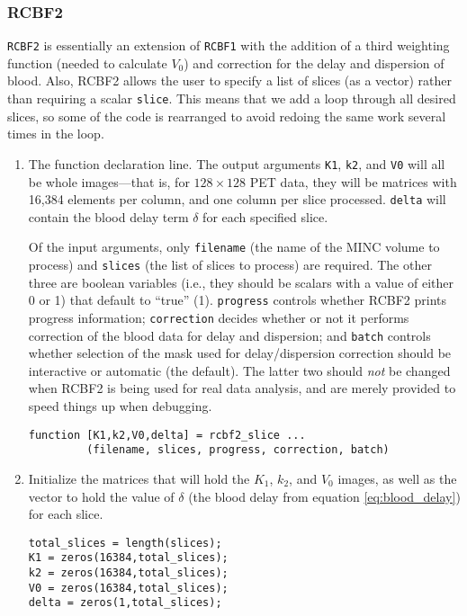 \documentclass[12pt]{article}
\def\code#1{{\tt #1}}
\begin{document}
\subsubsection{RCBF2}
\label{sec:rcbf2_listing}

\code{RCBF2} is essentially an extension of \code{RCBF1} with the
addition of a third weighting function (needed to calculate $V_0$) and
correction for the delay and dispersion of blood.  Also, RCBF2
allows the user to specify a list of slices (as a vector) rather than
requiring a scalar \code{slice}.  This means that we add a loop
through all desired slices, so some of the code is rearranged to avoid
redoing the same work several times in the loop.

\begin{enumerate}
\item The function declaration line.  The output arguments \code{K1},
  \code{k2}, and \code{V0} will all be whole images---that is, for
  $128 \times 128$ PET data, they will be matrices with 16,384
  elements per column, and one column per slice processed.
  \code{delta} will contain the blood delay term $\delta$ for each
  specified slice.

  Of the input arguments, only \code{filename} (the name of the MINC
  volume to process) and \code{slices} (the list of slices to process)
  are required.  The other three are boolean variables (i.e., they
  should be scalars with a value of either 0 or 1) that default to
  ``true'' (1).  \code{progress} controls whether RCBF2 prints
  progress information; \code{correction} decides whether or not it
  performs correction of the blood data for delay and dispersion; and
  \code{batch} controls whether selection of the mask used for
  delay/dispersion correction should be interactive or automatic (the
  default).  The latter two should {\em not} be changed when RCBF2 is
  being used for real data analysis, and are merely provided to speed
  things up when debugging.
  \begin{verbatim}
function [K1,k2,V0,delta] = rcbf2_slice ...
         (filename, slices, progress, correction, batch)
  \end{verbatim}

\item Initialize the matrices that will hold the $K_1$, $k_2$, and
  $V_0$ images, as well as the vector to hold the value of $\delta$
  (the blood delay from equation \ref{eq:blood_delay}) for each slice.
  \begin{verbatim}
total_slices = length(slices);
K1 = zeros(16384,total_slices);
k2 = zeros(16384,total_slices);
V0 = zeros(16384,total_slices);
delta = zeros(1,total_slices);
  \end{verbatim}


\end{enumerate}
\end{document}
